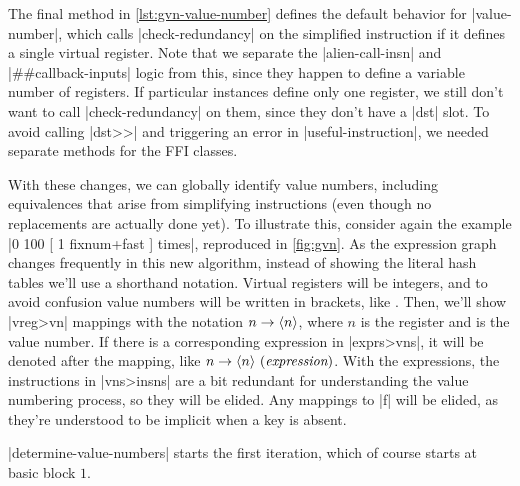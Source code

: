 The final method in \vref{lst:gvn-value-number} defines the default behavior
for \factor|value-number|, which calls \factor|check-redundancy| on the
simplified instruction if it defines a single virtual register.  Note that we
separate the \factor|alien-call-insn| and \factor|##callback-inputs| logic from
this, since they happen to define a variable number of registers.  If
particular instances define only one register, we still don't want to call
\factor|check-redundancy| on them, since they don't have a \factor|dst| slot.
To avoid calling \factor|dst>>| and triggering an error in
\factor|useful-instruction|, we needed separate methods for the \gls{FFI}
classes.


With these changes, we can globally identify value numbers, including
equivalences that arise from simplifying instructions (even though no
replacements are actually done yet).  To illustrate this, consider again the
example
%
\factor|0 100 [ 1 fixnum+fast ] times|,
%
reproduced in \vref{fig:gvn}.  As the expression graph changes frequently in
this new algorithm, instead of showing the literal hash tables we'll use a
shorthand notation.  Virtual registers will be integers, and to avoid confusion
value numbers will be written in brackets, like .  Then, we'll show
\factor|vreg>vn| mappings with the notation $n\to\langle n\rangle$, where $n$ is the
register and  is the value number.  If there is a corresponding
expression in \factor|exprs>vns|, it will be denoted after the mapping, like
$n\to\langle n\rangle~(\textit{expression})$.  With the expressions, the instructions in
\factor|vns>insns| are a bit redundant for understanding the value numbering
process, so they will be elided.  Any mappings to \factor|f| will be elided, as
they're understood to be implicit when a key is absent.

\factor|determine-value-numbers| starts the first iteration, which of course
starts at basic block $1$.

